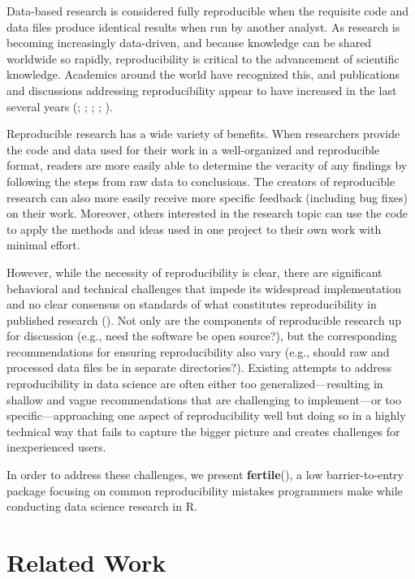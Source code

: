 \documentclass[APA,LATO1COL]{WileyNJD-v2}\usepackage[]{graphicx}\usepackage[]{color}
\newcommand{\pkg}[1]{\textbf{#1}}
\begin{document}
Data-based research is considered fully reproducible when the requisite code and data files produce identical results when run by another analyst. As research is becoming increasingly data-driven, and because knowledge can be shared worldwide so rapidly, reproducibility is critical to the advancement of scientific knowledge. Academics around the world have recognized this, and publications and discussions addressing reproducibility appear to have increased in the last several years (\cite{eisner-reproducibility}; \cite{sep-scientific-reproducibility}; \cite{bioessays-gosselin}; \cite{engineering-reproducibility}; \cite{plos-biology}). 

Reproducible research has a wide variety of benefits. When researchers provide the code and data used for their work in a well-organized and reproducible format, readers are more easily able to determine the veracity of any findings by following the steps from raw data to conclusions. The creators of reproducible research can also more easily receive more specific feedback (including bug fixes) on their work. Moreover, others interested in the research topic can use the code to apply the methods and ideas used in one project to their own work with minimal effort.

However, while the necessity of reproducibility is clear, there are significant behavioral and technical challenges that impede its widespread implementation and no clear consensus on standards of what constitutes reproducibility in published research (\cite{peng2009bio}). Not only are the components of reproducible research up for discussion (e.g., need the software be open source?), but the corresponding recommendations for ensuring reproducibility also vary (e.g., should raw and processed data files be in separate directories?).
Existing attempts to address reproducibility in data science are often either too generalized---resulting in shallow and vague recommendations that are challenging to implement---or too specific---approaching one aspect of reproducibility well but doing so in a highly technical way that fails to capture the bigger picture and creates challenges for inexperienced users.

In order to address these challenges, we present \pkg{fertile}(\cite{R-fertile}), a low barrier-to-entry package focusing on common reproducibility mistakes programmers make while conducting data science research in R.


\section{Related Work}\label{sec:lit}
\end{document}
